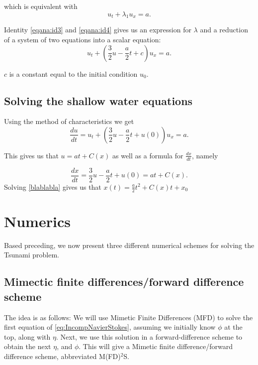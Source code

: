 \documentclass[11pt]{article}
\begin{document}
which is equivalent with
\begin{equation}
u_t + \lambda_1 u_x = a.
\end{equation}

Identity \ref{eqana:id3} and \ref{eqana:id4} gives us an expression for $\lambda$ and a reduction of a system of two equations into a scalar equation:
\begin{equation}
u_t + \left(\frac{3}{2}u - \frac{a}{2}t + c\right) u_x = a.
\end{equation}

$c$ is a constant equal to the initial condition $u_0$.

\subsection{Solving the shallow water equations}
Using the method of characteristics we get 
\begin{equation}
\frac{d u}{dt} = u_t + \left(\frac{3}{2}u - \frac{a}{2}t + u(0) \right) u_x = a.
\end{equation}

This gives us that $u = at + C(x)$ as well as a formula for $\frac{d x}{d t}$, namely

\begin{equation}
\label{blablabla}
\frac{d x}{d t} = \frac{3}{2}u - \frac{a}{2}t + u(0) = at + C(x).
\end{equation}
Solving \ref{blablabla} gives us that $x(t) = \frac{a}{2}t^2 + C(x) t + x_0$

%
%
\section{Numerics}

Based preceding, we now present three different numerical schemes for solving the Tsunami problem.
%
%
\subsection{Mimectic finite differences/forward difference scheme}

The idea is as follows: We will use Mimetic Finite Differences (MFD) \cite{} to solve the first equation of \eqref{eq:IncompNavierStokes}, assuming we initially know
$\phi$ at the top, along with $\eta$. Next, we use this solution in a forward-difference scheme to obtain the next $\eta$, and $\phi$. This will give a Mimetic finite
difference/forward difference scheme, abbreviated M(FD)$^2$S.
\end{document}
